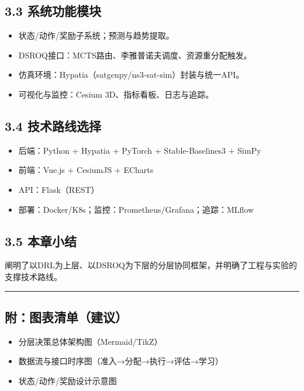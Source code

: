 \subsection{3.3
系统功能模块}\label{ux7cfbux7edfux529fux80fdux6a21ux5757}

\begin{itemize}
\tightlist
\item
  状态/动作/奖励子系统；预测与趋势提取。
\item
  DSROQ接口：MCTS路由、李雅普诺夫调度、资源重分配触发。
\item
  仿真环境：Hypatia（satgenpy/ns3-sat-sim）封装与统一API。
\item
  可视化与监控：Cesium 3D、指标看板、日志与追踪。
\end{itemize}

\subsection{3.4
技术路线选择}\label{ux6280ux672fux8defux7ebfux9009ux62e9}

\begin{itemize}
\tightlist
\item
  后端：Python + Hypatia + PyTorch + Stable-Baselines3 + SimPy
\item
  前端：Vue.js + CesiumJS + ECharts
\item
  API：Flask（REST）
\item
  部署：Docker/K8s；监控：Prometheus/Grafana；追踪：MLflow
\end{itemize}

\subsection{3.5 本章小结}\label{ux672cux7ae0ux5c0fux7ed3}

阐明了以DRL为上层、以DSROQ为下层的分层协同框架，并明确了工程与实验的支撑技术路线。

\begin{center}\rule{0.5\linewidth}{0.5pt}\end{center}

\subsection{附：图表清单（建议）}\label{ux9644ux56feux8868ux6e05ux5355ux5efaux8bae-1}

\begin{itemize}
\tightlist
\item
  分层决策总体架构图（Mermaid/TikZ）
\item
  数据流与接口时序图（准入→分配→执行→评估→学习）
\item
  状态/动作/奖励设计示意图
\end{itemize}

